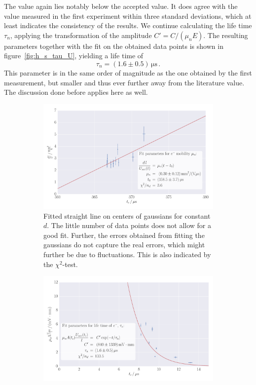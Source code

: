 The value again lies notably below the accepted value. It does agree 
with the value measured in the first experiment within three standard deviations, 
which at least indicates the consistency of the results. 
We continue calculating the life time $\tau_n$, applying the 
transformation of the amplitude $C' = C / (\mu_n E)$. The resulting 
parameters together with the fit on the obtained data points is shown 
in figure~\ref{fig:h_s_tau_U}, yielding a life time of 
\begin{equation}
    \tau_n = (1.6 \pm 0.5)\, \mathrm{\mu s} \, .
\end{equation}
This parameter is in the same order of magnitude as the one obtained 
by the first measurement, but smaller and thus ever further away from 
the literature value. The discussion done before applies here as well. 
\begin{figure}
    \centering
    \begin{subfigure}[b]{\pltw}
        \includegraphics[width=1.0\textwidth]{figures/haynes_shockley_mu_e_U}
        \caption{
            Fitted straight line on centers of gaussians for constant $d$.  
            The little number of data points does not allow for a good fit. 
            Further, the errors obtained from fitting the gaussians do not
            capture the real errors, which might further be due to 
            fluctuations. This is also indicated by the $\chi^2$-test.
            }
        \label{fig:h_s_mu_e_U}
    \end{subfigure}
    \begin{subfigure}[b]{\pltw}
        \includegraphics[width=1.0\textwidth]{figures/haynes_shockley_tau_U}

\end{subfigure}
\end{figure}
